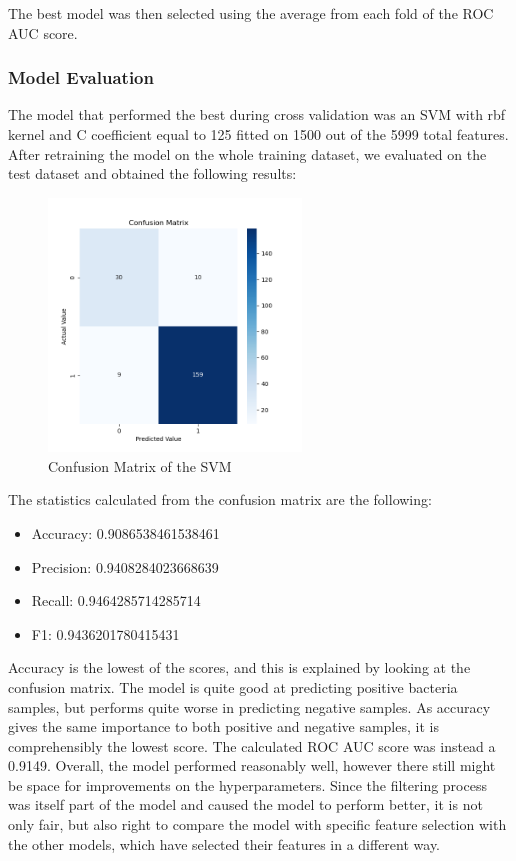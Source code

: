 \documentclass{article}
\begin{document}
The best model was then selected using the average from each fold of the ROC AUC score. 

\subsubsection{Model Evaluation}

The model that performed the best during cross validation was an SVM with rbf kernel and C coefficient equal to 125 fitted on 1500 out of the 5999 total features. After retraining the model on the whole training dataset, we evaluated on the test dataset and obtained the following results:

\begin{figure}[h]
	\centering
	\includegraphics[width=0.6\textwidth]{confusion_matrix_SVM.png}
	 \vspace{-1em}
	\caption{Confusion Matrix of the SVM}
\end{figure}

The statistics calculated from the confusion matrix are the following: 
\begin{itemize}
  \item Accuracy:   0.9086538461538461
  \item Precision:   0.9408284023668639
  \item Recall:   0.9464285714285714
  \item F1:   0.9436201780415431
\end{itemize}
Accuracy is the lowest of the scores, and this is explained by looking at the confusion matrix. The model is quite good at predicting positive bacteria samples, but performs quite worse in predicting negative samples. As accuracy gives the same importance to both positive and negative samples, it is comprehensibly the lowest score. The calculated ROC AUC score was instead a 0.9149. Overall, the model performed reasonably well, however there still might be space for improvements on the hyperparameters.
Since the filtering process was itself part of the model and caused the model to perform better, it is not only fair, but also right to compare the model with specific feature selection with the other models, which have selected their features in a different way.
\end{document}
